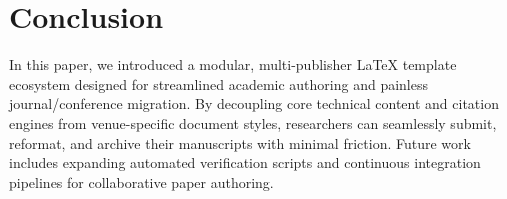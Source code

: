 
\section{Conclusion}
\label{sec:conclusion}

In this paper, we introduced a modular, multi-publisher LaTeX template ecosystem designed for streamlined academic authoring and painless journal/conference migration. By decoupling core technical content and citation engines from venue-specific document styles, researchers can seamlessly submit, reformat, and archive their manuscripts with minimal friction. Future work includes expanding automated verification scripts and continuous integration pipelines for collaborative paper authoring.
